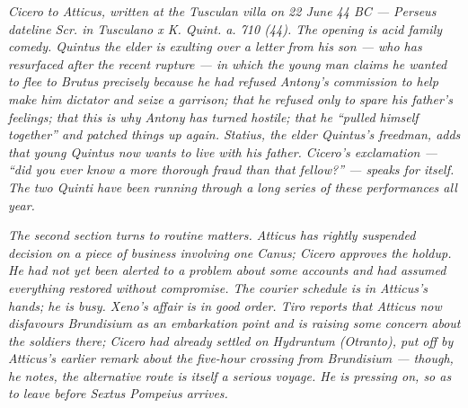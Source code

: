 
\textit{Cicero to Atticus, written at the Tusculan villa on
22 June 44 BC --- Perseus dateline \textit{Scr. in Tusculano x
K. Quint. a. 710 (44)}. The opening is acid family comedy.
Quintus the elder is exulting over a letter from his son ---
who has resurfaced after the recent rupture --- in which the
young man claims he wanted to flee to Brutus precisely because
he had refused Antony's commission to help make him dictator
and seize a garrison; that he refused only to spare his
father's feelings; that this is why Antony has turned hostile;
that he ``pulled himself together'' and patched things up
again. Statius, the elder Quintus's freedman, adds that young
Quintus now wants to live with his father. Cicero's
exclamation --- ``did you ever know a more thorough fraud than
that fellow?'' --- speaks for itself. The two Quinti have been
running through a long series of these performances all year.}

\textit{The second section turns to routine matters. Atticus
has rightly suspended decision on a piece of business
involving one Canus; Cicero approves the holdup. He had not
yet been alerted to a problem about some accounts and had
assumed everything restored without compromise. The courier
schedule is in Atticus's hands; he is busy. Xeno's affair is
in good order. Tiro reports that Atticus now disfavours
Brundisium as an embarkation point and is raising some
concern about the soldiers there; Cicero had already settled
on Hydruntum (Otranto), put off by Atticus's earlier remark
about the five-hour crossing from Brundisium --- though, he
notes, the alternative route is itself a serious voyage. He
is pressing on, so as to leave before Sextus Pompeius
arrives.}
